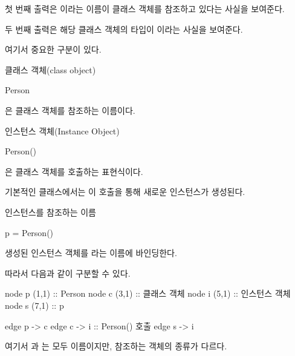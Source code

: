 첫 번째 출력은 이라는 이름이 클래스 객체를 참조하고 있다는 사실을 보여준다.

두 번째 출력은 해당 클래스 객체의 타입이 이라는 사실을 보여준다.

여기서 중요한 구분이 있다.

\begin{dhknote}
\begin{dhksmry}[centered]
클래스 객체(class object)
\end{dhksmry}
\end{dhknote}

\begin{dhkcode}
Person
\end{dhkcode}

은 클래스 객체를 참조하는 이름이다.

\begin{dhknote}
\begin{dhksmry}[centered]
인스턴스 객체(Instance Object)
\end{dhksmry}
\end{dhknote}

\begin{dhkcode}
Person()
\end{dhkcode}

은 클래스 객체를 호출하는 표현식이다.

기본적인 클래스에서는 이 호출을 통해 새로운 인스턴스가 생성된다.

\begin{dhknote}
\begin{dhksmry}[centered]
인스턴스를 참조하는 이름
\end{dhksmry}
\end{dhknote}

\begin{dhkcode}
p = Person()
\end{dhkcode}

생성된 인스턴스 객체를 라는 이름에 바인딩한다.

따라서 다음과 같이 구분할 수 있다.

\begin{dhkdiagram}[in=10]
node p (1,1) :: Person
node c (3,1) :: 클래스 객체
node i (5,1) :: 인스턴스 객체
node s (7,1) :: p

edge p -> c
edge c -> i :: Person() 호출
edge s -> i
\end{dhkdiagram}

여기서 과 는 모두 이름이지만, 참조하는 객체의 종류가 다르다.

